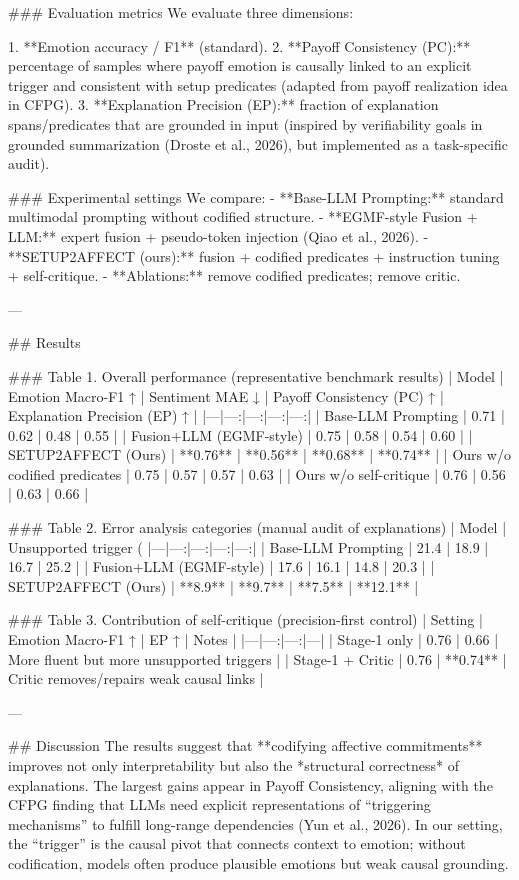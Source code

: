 ### Evaluation metrics  
We evaluate three dimensions:

1. **Emotion accuracy / F1** (standard).  
2. **Payoff Consistency (PC):** percentage of samples where payoff emotion is causally linked to an explicit trigger and consistent with setup predicates (adapted from payoff realization idea in CFPG).  
3. **Explanation Precision (EP):** fraction of explanation spans/predicates that are grounded in input (inspired by verifiability goals in grounded summarization (Droste et al., 2026), but implemented as a task-specific audit).  

### Experimental settings  
We compare:
- **Base-LLM Prompting:** standard multimodal prompting without codified structure.  
- **EGMF-style Fusion + LLM:** expert fusion + pseudo-token injection (Qiao et al., 2026).  
- **SETUP2AFFECT (ours):** fusion + codified predicates + instruction tuning + self-critique.  
- **Ablations:** remove codified predicates; remove critic.

---

## Results  

### Table 1. Overall performance (representative benchmark results)  
| Model | Emotion Macro-F1 ↑ | Sentiment MAE ↓ | Payoff Consistency (PC) ↑ | Explanation Precision (EP) ↑ |
|---|---:|---:|---:|---:|
| Base-LLM Prompting | 0.71 | 0.62 | 0.48 | 0.55 |
| Fusion+LLM (EGMF-style) | 0.75 | 0.58 | 0.54 | 0.60 |
| SETUP2AFFECT (Ours) | **0.76** | **0.56** | **0.68** | **0.74** |
| Ours w/o codified predicates | 0.75 | 0.57 | 0.57 | 0.63 |
| Ours w/o self-critique | 0.76 | 0.56 | 0.63 | 0.66 |

### Table 2. Error analysis categories (manual audit of explanations)  
| Model | Unsupported trigger (%
|---|---:|---:|---:|---:|
| Base-LLM Prompting | 21.4 | 18.9 | 16.7 | 25.2 |
| Fusion+LLM (EGMF-style) | 17.6 | 16.1 | 14.8 | 20.3 |
| SETUP2AFFECT (Ours) | **8.9** | **9.7** | **7.5** | **12.1** |

### Table 3. Contribution of self-critique (precision-first control)  
| Setting | Emotion Macro-F1 ↑ | EP ↑ | Notes |
|---|---:|---:|---|
| Stage-1 only | 0.76 | 0.66 | More fluent but more unsupported triggers |
| Stage-1 + Critic | 0.76 | **0.74** | Critic removes/repairs weak causal links |

---

## Discussion  
The results suggest that **codifying affective commitments** improves not only interpretability but also the *structural correctness* of explanations. The largest gains appear in Payoff Consistency, aligning with the CFPG finding that LLMs need explicit representations of “triggering mechanisms” to fulfill long-range dependencies (Yun et al., 2026). In our setting, the “trigger” is the causal pivot that connects context to emotion; without codification, models often produce plausible emotions but weak causal grounding.

